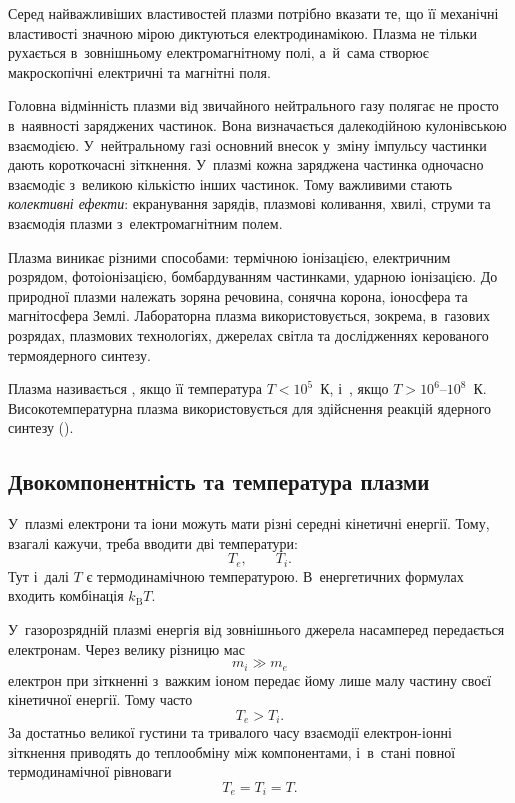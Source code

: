Серед найважливіших властивостей плазми потрібно вказати те, що її механічні властивості значною мірою диктуються електродинамікою. Плазма не тільки рухається в~зовнішньому електромагнітному полі, а~й~сама створює макроскопічні електричні та магнітні поля.

Головна відмінність плазми від звичайного нейтрального газу полягає не просто в~наявності заряджених частинок. Вона визначається далекодійною кулонівською взаємодією. У~нейтральному газі основний внесок у~зміну імпульсу частинки дають короткочасні зіткнення. У~плазмі кожна заряджена частинка одночасно взаємодіє з~великою кількістю інших частинок. Тому важливими стають \emph{колективні ефекти}: екранування зарядів, плазмові коливання, хвилі, струми та взаємодія плазми з~електромагнітним полем.

Плазма виникає різними способами: термічною іонізацією, електричним розрядом, фотоіонізацією, бомбардуванням частинками, ударною іонізацією. До природної плазми належать зоряна речовина, сонячна корона, іоносфера та магнітосфера Землі. Лабораторна плазма використовується, зокрема, в~газових розрядах, плазмових технологіях, джерелах світла та дослідженнях керованого термоядерного синтезу.

Плазма називається , якщо її температура $T < 10^5$~К, і~, якщо $T > 10^6$--$10^8$~К. Високотемпературна плазма використовується для здійснення реакцій ядерного синтезу ().

\subsection{Двокомпонентність та температура плазми}

У~плазмі електрони та іони можуть мати різні середні кінетичні енергії. Тому, взагалі кажучи, треба вводити дві температури:
\begin{equation}
	T_e,\qquad T_i.
\end{equation}
Тут і~далі $T$ є термодинамічною температурою. В~енергетичних формулах входить комбінація $k_{\mathrm B}T$.

У~газорозрядній плазмі енергія від зовнішнього джерела насамперед передається електронам. Через велику різницю мас
\begin{equation*}
	m_i\gg m_e
\end{equation*}
електрон при зіткненні з~важким іоном передає йому лише малу частину своєї кінетичної енергії. Тому часто
\begin{equation}
	T_e>T_i.
\end{equation}
За достатньо великої густини та тривалого часу взаємодії електрон-іонні зіткнення приводять до теплообміну між компонентами, і~в~стані повної термодинамічної рівноваги
\begin{equation*}
	T_e=T_i=T.
\end{equation*}

